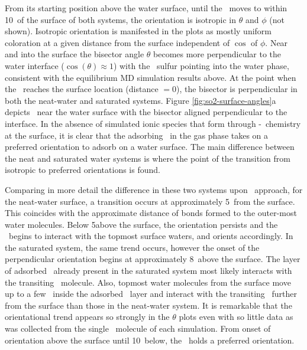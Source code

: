 	From its starting position above the water surface, until the \suldiox~moves to within 10\angs~of the surface of both systems, the orientation is isotropic in $\theta$ and $\phi$ (not shown). Isotropic orientation is manifested in the plots as mostly uniform coloration at a given distance from the surface independent of $\cos$ of $\phi$. Near and into the surface the bisector angle $\theta$ becomes more perpendicular to the water interface ($\cos(\theta)\approx1$) with the \suldiox~sulfur pointing into the water phase, consistent with the equilibrium MD simulation results above. At the point when the \suldiox~reaches the surface location (distance $=0$\angs), the bisector is perpendicular in both the neat-water and saturated systems. Figure \ref{fig:so2-surface-angles}a depicts \suldiox~near the water surface with the bisector aligned perpendicular to the interface. In the absence of simulated ionic species that form through \suldiox-\wat~chemistry at the surface, it is clear that the adsorbing \suldiox~in the gas phase takes on a preferred orientation to adsorb on a water surface. The main difference between the neat and saturated water systems is where the point of the transition from isotropic to preferred orientations is found. 
 
  Comparing in more detail the difference in these two systems upon \suldiox~approach, for the neat-water surface, a transition occurs at approximately 5\angs~from the surface. This coincides with the approximate distance of bonds formed to the outer-most water molecules. Below 5\angs above the surface, the orientation persists and the \suldiox~begins to interact with the topmost surface waters, and orients accordingly. In the saturated system, the same trend occurs, however the onset of the perpendicular orientation begins at approximately 8\angs~above the surface. The layer of adsorbed \suldiox~already present in the saturated system most likely interacts with the transiting \suldiox~molecule. Also, topmost water molecules from the surface move up to a few \angs~inside the adsorbed \suldiox~layer and interact with the transiting \suldiox~further from the surface than those in the neat-water system. It is remarkable that the orientational trend appears so strongly in the $\theta$ plots even with so little data as was collected from the single \suldiox~molecule of each simulation. From onset of orientation above the surface until 10\angs~below, the \suldiox~holds a preferred orientation.

